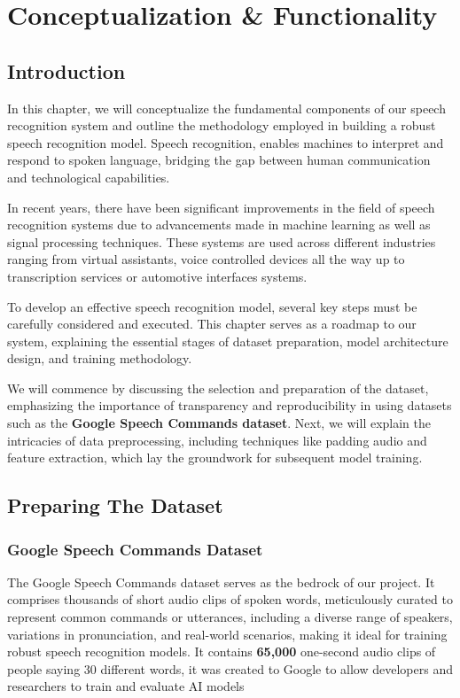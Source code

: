 \documentclass[a4paper]{report}
\begin{document}
{\chapter{Conceptualization \& Functionality}
\section{Introduction}
In this chapter, we will conceptualize the fundamental components of our speech recognition system and outline the methodology employed in building a robust speech recognition model. Speech recognition, enables machines to interpret and respond to spoken language, bridging the gap between human communication and technological capabilities.

In recent years, there have been significant improvements in the field of speech recognition systems due to advancements made in machine learning as well as signal processing techniques. These systems are used across different industries ranging from virtual assistants, voice controlled devices all the way up to transcription services or automotive interfaces systems.

To develop an effective speech recognition model, several key steps must be carefully considered and executed. This chapter serves as a roadmap to our system, explaining the essential stages of dataset preparation, model architecture design, and training methodology.

We will commence by discussing the selection and preparation of the dataset, emphasizing the importance of transparency and reproducibility in using datasets such as the \textbf{Google Speech Commands dataset}. Next, we will explain the intricacies of data preprocessing, including techniques like padding audio and feature extraction, which lay the groundwork for subsequent model training.
\section{Preparing The Dataset}
\subsection{Google Speech Commands Dataset}
The Google Speech Commands dataset serves as the bedrock of our project. It comprises thousands of short audio clips of spoken words, meticulously curated to represent common commands or utterances, including a diverse range of speakers, variations in pronunciation, and real-world scenarios, making it ideal for training robust speech recognition models. It contains \textbf{65,000} one-second audio clips of people saying 30 different words, it was created to Google to allow developers and researchers to train and evaluate AI models
}
\end{document}
